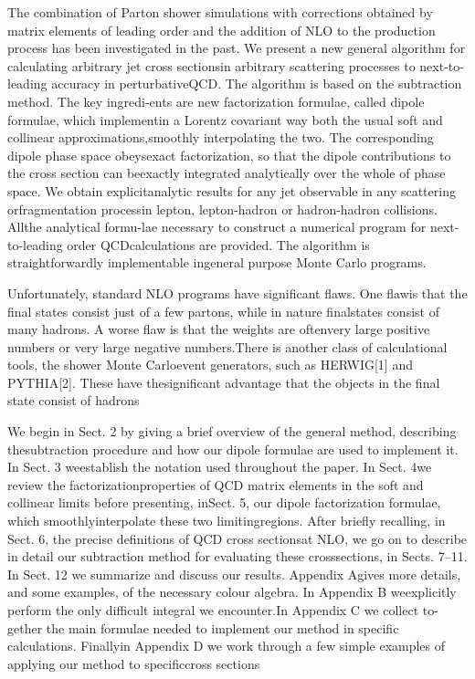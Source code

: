 The combination of Parton shower simulations with corrections obtained by matrix elements of leading order and the addition of NLO to the production process has been investigated in the past. We present a new general algorithm for calculating arbitrary jet cross sectionsin arbitrary scattering processes to next-to-leading accuracy in perturbativeQCD. The algorithm is based on the subtraction method. The key ingredi-ents are new factorization formulae, called dipole formulae, which implementin a Lorentz covariant way both the usual soft and collinear approximations,smoothly interpolating the two. The corresponding dipole phase space obeysexact factorization, so that the dipole contributions to the cross section can beexactly integrated analytically over the whole of phase space. We obtain explicitanalytic results for any jet observable in any scattering orfragmentation processin lepton, lepton-hadron or hadron-hadron collisions. Allthe analytical formu-lae necessary to construct a numerical program for next-to-leading order QCDcalculations are provided. The algorithm is straightforwardly implementable ingeneral purpose Monte Carlo programs.



Unfortunately, standard NLO programs have significant flaws. One flawis that the final states consist just of a few partons, while in nature finalstates consist of many hadrons. A worse flaw is that the weights are oftenvery large positive numbers or very large negative numbers.There is another class of calculational tools, the shower Monte Carloevent generators, such as HERWIG[1] and PYTHIA[2]. These have thesignificant advantage that the objects in the final state consist of hadrons


We begin in Sect. 2 by giving a brief overview of the general method, describing thesubtraction procedure and how our dipole formulae are used to implement it. In Sect. 3 weestablish the notation used throughout the paper. In Sect. 4we review the factorizationproperties of QCD matrix elements in the soft and collinear limits before presenting, inSect. 5, our dipole factorization formulae, which smoothlyinterpolate these two limitingregions. After briefly recalling, in Sect. 6, the precise definitions of QCD cross sectionsat NLO, we go on to describe in detail our subtraction method for evaluating these crosssections, in Sects. 7–11. In Sect. 12 we summarize and discuss our results. Appendix Agives more details, and some examples, of the necessary colour algebra. In Appendix B weexplicitly perform the only difficult integral we encounter.In Appendix C we collect to-gether the main formulae needed to implement our method in specific calculations. Finallyin Appendix D we work through a few simple examples of applying our method to specificcross sections